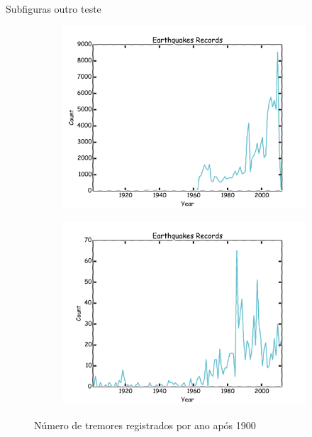 \documentclass[ucs,8pt]{beamer}
\begin{document}
\begin{frame}{Subfiguras\: outro teste}

\begin{figure}[H]
	\centering
	\begin{subfigure}[b]{0.48\textwidth}
		  	\centering
			\includegraphics[width=1.00\textwidth]{images/hmtk_sa3_rate}
			\label{fig:sa_eq_record}
	\end{subfigure}%
	\quad %
	\begin{subfigure}[b]{0.48\textwidth}
		  	\centering
			\includegraphics[width=1.00\textwidth]{images/hmtk_bsb2013_rate}
			\label{fig:br_eq_record}
    \end{subfigure}%
	\caption{Número de tremores registrados por ano após 1900}
	\label{fig:eq_record}
\end{figure}
\end{frame}
\end{document}

